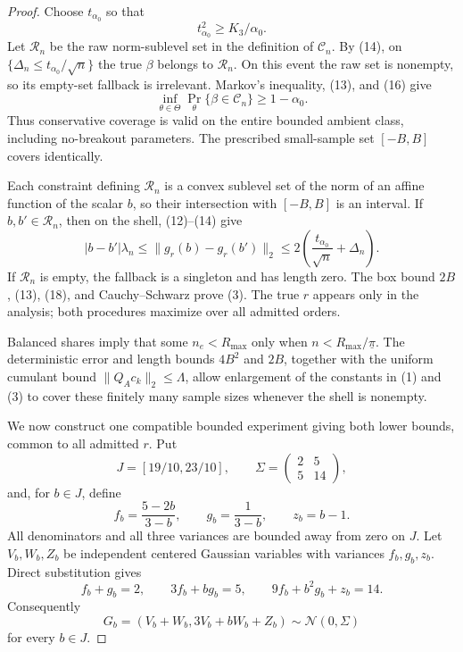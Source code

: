 \documentclass{article}
\begin{document}
\begin{proof}
Choose \(t_{\alpha_0}\) so that
\[
 t_{\alpha_0}^2\geq K_3/\alpha_0.                                        \tag{16}
\]
Let \(\mathcal R_n\) be the raw norm-sublevel set in the definition of \(\mathcal C_n\).  By (14), on \(\{\Delta_n\leq t_{\alpha_0}/\sqrt n\}\) the true \(\beta\) belongs to \(\mathcal R_n\).  On this event the raw set is nonempty, so its empty-set fallback is irrelevant.  Markov's inequality, (13), and (16) give
\[
 \inf_{\theta\in\Theta}
 \Pr_\theta\{\beta\in\mathcal C_n\}\geq1-\alpha_0.                    \tag{17}
\]
Thus conservative coverage is valid on the entire bounded ambient class, including no-breakout parameters.  The prescribed small-sample set \([-B,B]\) covers identically.

Each constraint defining \(\mathcal R_n\) is a convex sublevel set of the norm of an affine function of the scalar \(b\), so their intersection with \([-B,B]\) is an interval.  If \(b,b'\in\mathcal R_n\), then on the shell, (12)--(14) give
\[
 |b-b'|\lambda_n
 \leq\|g_r(b)-g_r(b')\|_2
 \leq2\left(\frac{t_{\alpha_0}}{\sqrt n}+\Delta_n\right).               \tag{18}
\]
If \(\mathcal R_n\) is empty, the fallback is a singleton and has length zero.  The box bound \(2B\), (13), (18), and Cauchy--Schwarz prove (3).  The true \(r\) appears only in the analysis; both procedures maximize over all admitted orders.

Balanced shares imply that some \(n_e<R_{\max}\) only when \(n<R_{\max}/\underline\pi\).  The deterministic error and length bounds \(4B^2\) and \(2B\), together with the uniform cumulant bound \(\|Q_Ac_k\|_2\leq\Lambda\), allow enlargement of the constants in (1) and (3) to cover these finitely many sample sizes whenever the shell is nonempty.

We now construct one compatible bounded experiment giving both lower bounds, common to all admitted \(r\).  Put
\[
 J=[19/10,23/10],
 \qquad \Sigma=\begin{pmatrix}2&5\\5&14\end{pmatrix},
\]
and, for \(b\in J\), define
\[
 f_b=\frac{5-2b}{3-b},\qquad
 g_b=\frac1{3-b},\qquad z_b=b-1.                                         \tag{19}
\]
All denominators and all three variances are bounded away from zero on \(J\).  Let \(V_b,W_b,Z_b\) be independent centered Gaussian variables with variances \(f_b,g_b,z_b\).  Direct substitution gives
\[
 f_b+g_b=2,
 \qquad3f_b+bg_b=5,
 \qquad9f_b+b^2g_b+z_b=14.                                                \tag{20}
\]
Consequently
\[
 G_b=(V_b+W_b,3V_b+bW_b+Z_b)\sim\mathcal N(0,\Sigma)                     \tag{21}
\]
for every \(b\in J\).


\end{proof}
\end{document}
